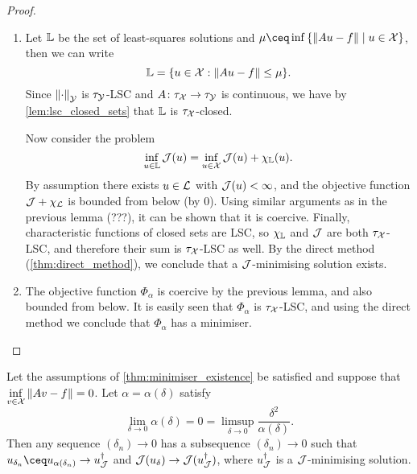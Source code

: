 \begin{proof}
	\begin{enumerate}
		\item Let $\mathbb L$ be the set of least-squares solutions and $\mu \ceq \inf\qty{\norm{Au - f} \mid u \in \XX}$, then we can write
		\[
		\mathbb L = \qty{u \in \mathcal X: \norm{Au - f} \leq \mu}. 
		\]
		Since $\norm{\cdot}_\mathcal Y$ is $\tau_\mathcal Y$-LSC and $A \colon \tau_\mathcal X \to \tau_\mathcal Y$ is continuous, we have by \cref{lem:lsc_closed_sets} that $\mathbb L$ is $\tau_\mathcal X$-closed.
		
		Now consider the problem 
		\[
		\inf_{u \in \mathbb L} \mathcal J(u) = \inf_{u \in \mathcal X} \mathcal J(u) + \chi_\mathbb L(u). 
		\] 
		By assumption there exists $u \in \mathcal L$ with $\mathcal J(u) < \infty$, and the objective function $\mathcal J + \chi_\mathcal L$ is bounded from below (by 0). Using similar arguments as in the previous lemma (???), it can be shown that it is coercive. Finally, characteristic functions of closed sets are LSC, so $\chi_\mathbb L$ and $\mathcal J$ are both $\tau_\mathcal X$-LSC, and therefore their sum is $\tau_\mathcal X$-LSC as well. By the direct method (\cref{thm:direct_method}), we conclude that a $\mathcal J$-minimising solution exists. 
		
		\item The objective function $\Phi_\alpha$ is coercive by the previous lemma, and also bounded from below. It is easily seen that $\Phi_\alpha$ is $\tau_\mathcal X$-LSC, and using the direct method we conclude that $\Phi_\alpha$ has a minimiser. 
	\end{enumerate}
\end{proof}

\begin{theorem}
	Let the assumptions of \cref{thm:minimiser_existence} be satisfied and suppose that $\inf\limits_{v \in \mathcal X} \norm{Av - f} = 0$. 
	Let $\alpha = \alpha(\delta)$ satisfy \[
	\lim_{\delta\to0} \alpha(\delta) = 0  = \limsup_{\delta \to 0} \frac{\delta^2}{\alpha(\delta)}. 
	\]
	Then any sequence $(\delta_n) \to 0$ has a subsequence $(\delta_n) \to 0$ such that $u_{\delta_n} \ceq u_{\alpha(\delta_n)} \to u_\JJ \D$ and $\mathcal J(u_\delta) \to \mathcal J(u_\mathcal J^\dagger)$, where $u_\mathcal J^\dagger$ is a $\mathcal J$-minimising solution. 
\end{theorem}

